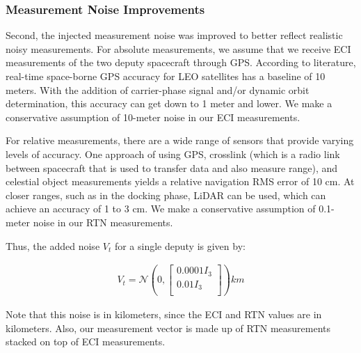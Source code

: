 \subsubsection{Measurement Noise Improvements}
Second, the injected measurement noise was improved to better reflect realistic noisy measurements. For absolute measurements, we assume that we receive ECI measurements of the two deputy spacecraft through GPS. According to literature, real-time space-borne GPS accuracy for LEO satellites has a baseline of 10 meters. With the addition of carrier-phase signal and/or dynamic orbit determination, this accuracy can get down to 1 meter and lower. \cite{montenbruck2008precision} We make a conservative assumption of 10-meter noise in our ECI measurements. 

For relative measurements, there are a wide range of sensors that provide varying levels of accuracy. One approach of using GPS, crosslink (which is a radio link between spacecraft that is used to transfer data and also measure range), and celestial object measurements yields a relative navigation RMS error of 10 cm. \cite{long2002relative} At closer ranges, such as in the docking phase, LiDAR can be used, which can achieve an accuracy of 1 to 3 cm. \cite{cail_software_usu} We make a conservative assumption of 0.1-meter noise in our RTN measurements. 

Thus, the added noise $V_t$ for a single deputy is given by:

\begin{align}
    V_{t} = \mathcal{N}\left(0, \begin{bmatrix}
        0.0001 I_3 \\
         0.01I_3 \\
 \end{bmatrix}\right) km \label{eq:added_noise_new}
\end{align}

Note that this noise is in kilometers, since the ECI and RTN values are in kilometers. Also, our measurement vector is made up of RTN measurements stacked on top of ECI measurements. 

